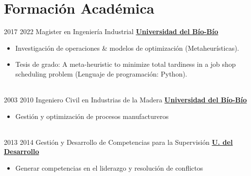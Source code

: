 \documentclass[letterpaper]{DS_class_file} %
\begin{document}
\makeprofile %


\section{Formación Académica}

\begin{twenty} %
   	\twentyitem
	    {2017}
		{2022}
	    {\hspace{0.2cm}Magister en Ingeniería Industrial}
	    {\href{https://magister.industrial.ubiobio.cl/}{\hspace{0.27cm} \textbf{Universidad del Bío-Bío} }}
	    {}
	    {\begin{itemize}
			\item Investigación de operaciones \& modelos de optimización (Metaheurísticas).
			\item Tesis de grado: A meta-heuristic to minimize total tardiness in a job shop scheduling problem (Lenguaje de programación: Python).
		\end{itemize}} 
		\\
	   	\twentyitem
			{2003}
			{2010}
			{\hspace{0.2cm}Ingeniero Civil en Industrias de la Madera}
			{\href{http://dimad.ubiobio.cl/icim/nweb/public/carreras/ingenieria-civil-en-industrias-de-la-madera}{\hspace{0.27cm} \textbf{Universidad del Bío-Bío} }}
			{}
			{\begin{itemize}
					\item Gestión y optimización de procesos manufactureros
			\end{itemize}} 
			\\
				   	\twentyitem
			{2013}
			{2014}
			{\hspace{0.2cm}Gestión y Desarrollo de Competencias para la Supervisión}
			{\href{https://www.udd.cl/extension-y-capacitacion/diplomados/page/2/}{\hspace{0.05cm} \textbf{U. del Desarrollo} }}
			{}
			{\begin{itemize}
					\item Generar competencias en el liderazgo y  resolución de conflictos
			\end{itemize}} 
			\\
\end{twenty}
\end{document}
